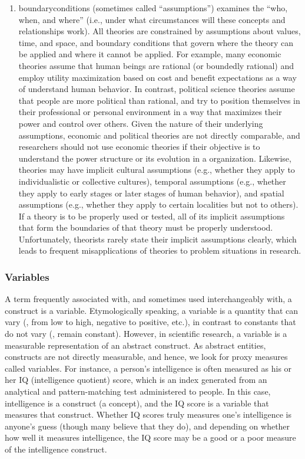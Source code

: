\begin{enumerate}
	\item \Glspl{boundarycondition} (sometimes called ``assumptions'') examines the ``who, when, and where'' (i.e., under what circumstances will these concepts and relationships work). All theories are constrained by assumptions about values, time, and space, and boundary conditions that govern where the theory can be applied and where it cannot be applied. For example, many economic theories assume that human beings are rational (or boundedly rational) and employ utility maximization based on cost and benefit expectations as a way of understand human behavior. In contrast, political science theories assume that people are more political than rational, and try to position themselves in their professional or personal environment in a way that maximizes their power and control over others. Given the nature of their underlying assumptions, economic and political theories are not directly comparable, and researchers should not use economic theories if their objective is to understand the power structure or its evolution in a organization. Likewise, theories may have implicit cultural assumptions (e.g., whether they apply to individualistic or collective cultures), temporal assumptions (e.g., whether they apply to early stages or later stages of human behavior), and spatial assumptions (e.g., whether they apply to certain localities but not to others). If a theory is to be properly used or tested, all of its implicit assumptions that form the boundaries of that theory must be properly understood. Unfortunately, theorists rarely state their implicit assumptions clearly, which leads to frequent misapplications of theories to problem situations in research.
\end{enumerate}

\subsubsection{Variables}

A term frequently associated with, and sometimes used interchangeably with, a construct is a \gls{variable}. Etymologically speaking, a variable is a quantity that can vary (\eg, from low to high, negative to positive, etc.), in contrast to constants that do not vary (\ie, remain constant). However, in scientific research, a variable is a measurable representation of an abstract construct. As abstract entities, constructs are not directly measurable, and hence, we look for proxy measures called variables. For instance, a person’s intelligence is often measured as his or her IQ (intelligence quotient) score, which is an index generated from an analytical and pattern-matching test administered to people. In this case, intelligence is a construct (a concept), and the IQ score is a variable that measures that construct. Whether IQ scores truly measures one’s intelligence is anyone’s guess (though many believe that they do), and depending on whether how well it measures intelligence, the IQ score may be a good or a poor measure of the intelligence construct. 

